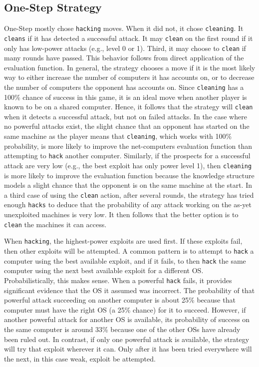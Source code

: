 \documentclass{sig-alternate}
\begin{document}
\subsection{One-Step Strategy}
One-Step mostly chose {\tt hacking} moves.
When it did not, it chose {\tt cleaning}.
It {\tt cleans} if it has detected a successful attack.
It may {\tt clean} on the first round if it only has low-power attacks (e.g., level 0 or 1).
Third, it may choose to {\tt clean} if many rounds have passed.
This behavior follows from direct application of the evaluation function.
In general, the strategy chooses a move if it is the most likely way to either increase the number of computers it has accounts on, or to decrease the number of computers the opponent has accounts on. Since {\tt cleaning} has a 100\% chance of success in this game, it is an ideal move when another player is known to be on a shared computer. 
Hence, it follows that the strategy will {\tt clean} when it detects a successful attack, but not on failed attacks. 
In the case where no powerful attacks exist, the slight chance that an opponent has started on the same machine as the player means that {\tt cleaning}, which works with 100\% probability, is more likely to improve the net-computers evaluation function than attempting to {\tt hack} another computer.
Similarly, if the prospects for a successful attack are very low (e.g., the best exploit has only power level 1), then {\tt cleaning} is more likely to improve the evaluation function because the knowledge structure models a slight chance that the opponent is on the same machine at the start.
In a third case of using the {\tt clean} action, after several rounds, the strategy has tried enough {\tt hacks} to deduce that the probability of any attack working on the as-yet unexploited machines is very low.
It then follows that the better option is to {\tt clean} the machines it can access.

When {\tt hacking}, the highest-power exploits are used first.
If these exploits fail, then other exploits will be attempted.
A common pattern is to attempt to {\tt hack} a computer using the best available exploit, and if it fails, to then {\tt hack} the same computer using the next best available exploit for a different OS.
Probabilistically, this makes sense. 
When a powerful {\tt hack} fails, it provides significant evidence that the OS it assumed was incorrect.
The probability of that powerful attack succeeding on another computer is about 25\% because that computer must have the right OS (a 25\% chance) for it to succeed.
However, if another powerful attack for another OS is available, its probability of success on the same computer is around 33\% because one of the other OSs have already been ruled out.
In contrast, if only one powerful attack is available, the strategy will try that exploit wherever it can.
Only after it has been tried everywhere will the next, in this case weak, exploit be attempted.
\end{document}

